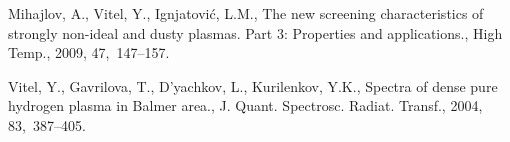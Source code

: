 \documentclass[a1]{sciposter}
\begin{document}
\begin{multicols}{3}
\begin{thebibliography}{99}
 Mihajlov, A., Vitel, Y., Ignjatovi{\'c}, L.M., The new screening characteristics of strongly non-ideal and dusty
  plasmas. Part 3: Properties and applications., High Temp., 2009, 47,~147--157.
  
 Vitel, Y., Gavrilova, T., D'yachkov, L., Kurilenkov, Y.K., Spectra of dense pure hydrogen plasma in Balmer area., J. Quant. Spectrosc. Radiat. Transf.,
  2004, 83,~387--405.

\end{thebibliography}

\end{multicols}
\end{document}
